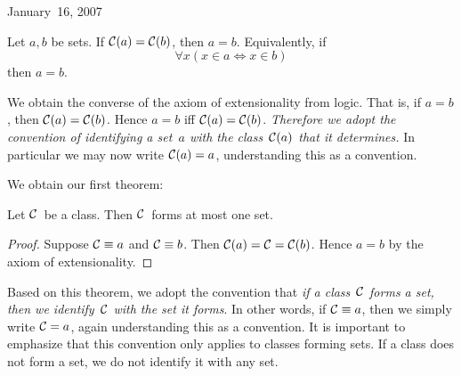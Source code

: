 \begin{lecture}{January~16, 2007}
\begin{axm}[Extension]
Let \(a,b\) be sets. If \(\mathcal{C}(a)=\mathcal{C}(b)\), then \(a=b\). Equivalently, if
\[\forall x(x\in a\iff x\in b)\]
then \(a=b\).
\end{axm}
\noindent We obtain the converse of the axiom of extensionality from logic. That is, if \(a=b\), then \(\mathcal{C}(a)=\mathcal{C}(b)\). Hence \(a=b\) iff \(\mathcal{C}(a)=\mathcal{C}(b)\). \emph{Therefore we adopt the convention of identifying a set~\(a\) with the class~\(\mathcal{C}(a)\) that it determines.} In particular we may now write \(\mathcal{C}(a)=a\), understanding this as a convention.

We obtain our first theorem:
\begin{thm}
Let \(\mathcal{C}\)~be a class. Then \(\mathcal{C}\)~forms at most one set.
\end{thm}
\begin{proof}
Suppose \(\mathcal{C}\equiv a\) and \(\mathcal{C}\equiv b\). Then \(\mathcal{C}(a)=\mathcal{C}=\mathcal{C}(b)\). Hence \(a=b\) by the axiom of extensionality.
\end{proof}
\noindent Based on this theorem, we adopt the convention that \emph{if a class~\(\mathcal{C}\) forms a set, then we identify~\(\mathcal{C}\) with the set it forms}. In other words, if \(\mathcal{C}\equiv a\), then we simply write \(\mathcal{C}=a\), again understanding this as a convention. It is important to emphasize that this convention only applies to classes forming sets. If a class does not form a set, we do not identify it with any set.
\end{lecture}
